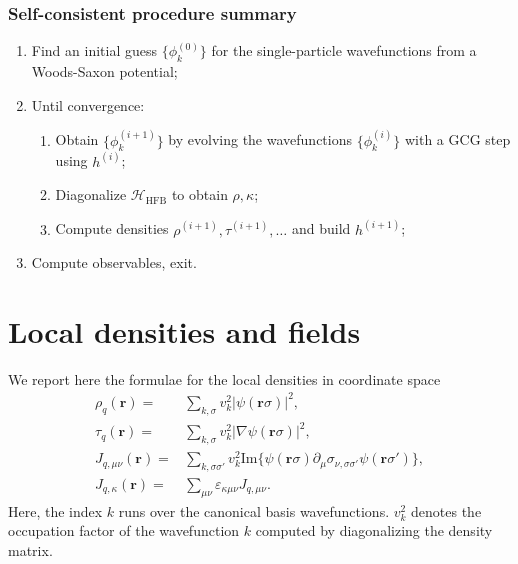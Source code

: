 \documentclass[%
 reprint, linenumbers,
 amsmath,amssymb,
 aps, physrev
]{revtex4-2}
\begin{document}
\subsubsection{Self-consistent procedure summary}
\begin{enumerate}
  \item Find an initial guess $\{{\phi_k^{(0)}\}}$ for the single-particle wavefunctions from a Woods-Saxon potential;
  \item Until convergence:
  \begin{enumerate}
    \item Obtain $\{{\phi_k^{(i+1)}\}}$ by evolving the wavefunctions $\{{\phi_k^{(i)}\}}$ with a GCG step using $h^{(i)}$;
    \item Diagonalize $\mathcal H_\text{HFB}$ to obtain $\rho,\kappa$;
    \item Compute densities $\rho^{(i+1)},\tau^{(i+1)},\ldots$ and build $h^{(i+1)}$;
  \end{enumerate}
  \item Compute observables, exit.
\end{enumerate}
\appendix
\section{Local densities and fields}
We report here the formulae for the local densities in coordinate space
\begin{align}
    \rho_q(\boldsymbol{r}) =& \sum_{k,\sigma}v_k^2|\psi(\boldsymbol r \sigma)|^2,\\
    \tau_q (\boldsymbol{r})=& \sum_{k,\sigma} v_k^2 |\nabla\psi(\boldsymbol{r}\sigma)|^2,\\
    J_{q, \mu\nu} (\boldsymbol{r})=& \sum_{k,\sigma\sigma'} v_k^2\text{Im}\{{\psi(\boldsymbol{r}\sigma)\partial_\mu\sigma_{\nu,\sigma\sigma'}\psi(\boldsymbol{r}\sigma')}\},
    \\J_{q,\kappa}(\boldsymbol{r})=&\sum_{\mu\nu}\varepsilon_{\kappa\mu\nu}J_{q,\mu\nu}.
\end{align}
Here, the index $k$ runs over the canonical basis wavefunctions. $v_k^2$ denotes the occupation factor of the wavefunction $k$ computed by diagonalizing the density matrix.
\end{document}
